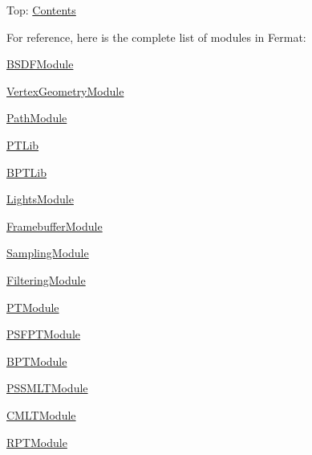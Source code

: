 Top\+: \hyperlink{_overture_contents_page}{Contents}

\begin{DoxyParagraph}{}
For reference, here is the complete list of modules in Fermat\+: ~\newline

\begin{DoxyItemize}
\item \hyperlink{group___b_s_d_f_module}{B\+S\+D\+F\+Module}
\item \hyperlink{group___vertex_geometry_module}{Vertex\+Geometry\+Module}
\item \hyperlink{group___path_module}{Path\+Module}
\item \hyperlink{_p_t_lib_page}{P\+T\+Lib}
\item \hyperlink{group___b_p_t_lib}{B\+P\+T\+Lib}
\item \hyperlink{group___lights_module}{Lights\+Module}
\item \hyperlink{group___framebuffer_module}{Framebuffer\+Module}
\item \hyperlink{group___sampling_module}{Sampling\+Module}
\item \hyperlink{group___filtering_module}{Filtering\+Module}
\item \hyperlink{group___p_t_module}{P\+T\+Module}
\item \hyperlink{group___p_s_f_p_t_module}{P\+S\+F\+P\+T\+Module}
\item \hyperlink{group___b_p_t_module}{B\+P\+T\+Module}
\item \hyperlink{group___p_s_s_m_l_t_module}{P\+S\+S\+M\+L\+T\+Module}
\item \hyperlink{group___c_m_l_t_module}{C\+M\+L\+T\+Module}
\item \hyperlink{group___r_p_t_module}{R\+P\+T\+Module} 
\end{DoxyItemize}
\end{DoxyParagraph}
